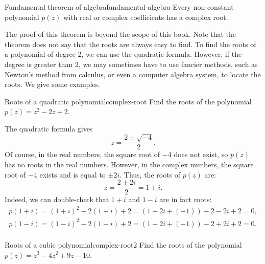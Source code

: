 \begin{theorem}{Fundamental theorem of algebra}{fundamental-algebra}
  Every non-constant polynomial $p(z)$ with real or complex
  coefficients has a complex root.
\end{theorem}

The proof of this theorem is beyond the scope of this book. Note that
the theorem does not say that the roots are always easy to find. To
find the roots of a polynomial of degree 2, we can use the quadratic
formula. However, if the degree is greater than 2, we may sometimes
have to use fancier methods, such as Newton's method from calculus, or
even a computer algebra system, to locate the roots. We give some
examples.

\begin{example}{Roots of a quadratic polynomial}{complex-root}
  Find the roots of the polynomial $p(z) = z^2 - 2z + 2$.
\end{example}

\begin{solution}
  The quadratic formula gives
  \begin{equation*}
    z = \frac{2 \pm \sqrt{-4}}{2}.
  \end{equation*}
  Of course, in the real numbers, the square root of $-4$ does not
  exist, so $p(z)$ has no roots in the real numbers. However, in the
  complex numbers, the square root of $-4$ exists and is equal to
  $\pm2i$. Thus, the roots of $p(z)$ are:
  \begin{equation*}
    z = \frac{2 \pm 2i}{2} = 1\pm i.
  \end{equation*}
  Indeed, we can double-check that $1+i$ and $1-i$ are in fact roots:
  \begin{equation*}
    \begin{array}{ll}
      p(1+i) = (1+i)^2 - 2(1+i) + 2 = (1 + 2i + (-1)) - 2 - 2i + 2 = 0, \\
      p(1-i) = (1-i)^2 - 2(1-i) + 2 = (1 - 2i + (-1)) - 2 + 2i + 2 = 0. \\
    \end{array}
  \end{equation*}
  \vspace{-2ex}
\end{solution}

\begin{example}{Roots of a cubic polynomial}{complex-root2}
  Find the roots of the polynomial $p(z) = z^3 - 4z^2 + 9z - 10$.
\end{example}

